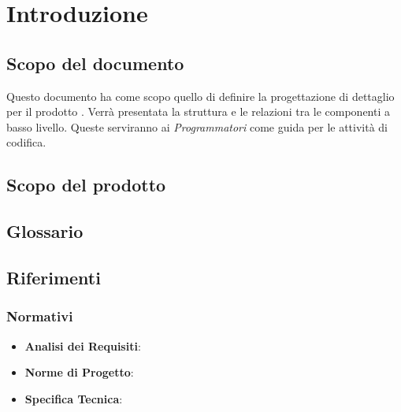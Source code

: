 %


\section{Introduzione} %
\label{sec:introduzione}
	\subsection{Scopo del documento} %
	\label{sub:scopo_del_documento}
	Questo documento ha come scopo quello di definire la progettazione di dettaglio per il prodotto \projectName. Verrà presentata la struttura e le relazioni tra le componenti a basso livello. Queste serviranno ai \emph{Programmatori} come guida per le attività di codifica.

	\subsection{Scopo del prodotto} %
	\label{sub:scopo_del_prodotto}
	\productScope

	\subsection{Glossario} %
	\label{sub:glossario}
	\glossarioDesc

	\subsection{Riferimenti} %
	\label{sub:riferimenti}
		\subsubsection{Normativi} %
		\label{ssub:normativi}
			\begin{itemize}
				\item \textbf{Analisi dei Requisiti}: \docNameVersionAdR
				\item \textbf{Norme di Progetto}: \docNameVersionNdP
				\item \textbf{Specifica Tecnica}: \docNameVersionST
			\end{itemize}

